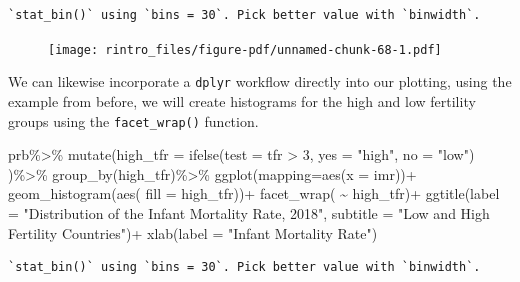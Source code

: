 \documentclass[
  letterpaper,
  DIV=11,
  numbers=noendperiod]{scrreprt}
\newenvironment{Shaded}{\begin{snugshade}}{\end{snugshade}}
\newcommand{\AttributeTok}[1]{\textcolor[rgb]{0.40,0.45,0.13}{#1}}
\newcommand{\DecValTok}[1]{\textcolor[rgb]{0.68,0.00,0.00}{#1}}
\newcommand{\FunctionTok}[1]{\textcolor[rgb]{0.28,0.35,0.67}{#1}}
\newcommand{\NormalTok}[1]{\textcolor[rgb]{0.00,0.23,0.31}{#1}}
\newcommand{\SpecialCharTok}[1]{\textcolor[rgb]{0.37,0.37,0.37}{#1}}
\newcommand{\StringTok}[1]{\textcolor[rgb]{0.13,0.47,0.30}{#1}}
\begin{document}
\begin{verbatim}
`stat_bin()` using `bins = 30`. Pick better value with `binwidth`.
\end{verbatim}

\begin{figure}[H]

{\centering \texttt{[image: rintro\_files/figure-pdf/unnamed-chunk-68-1.pdf]}

}

\end{figure}

We can likewise incorporate a \texttt{dplyr} workflow directly into our
plotting, using the example from before, we will create histograms for
the high and low fertility groups using the \texttt{facet\_wrap()}
function.

\begin{Shaded}
\begin{Highlighting}[]
\NormalTok{prb}\SpecialCharTok{\%\textgreater{}\%}
  \FunctionTok{mutate}\NormalTok{(}\AttributeTok{high\_tfr =} \FunctionTok{ifelse}\NormalTok{(}\AttributeTok{test =}\NormalTok{ tfr }\SpecialCharTok{\textgreater{}} \DecValTok{3}\NormalTok{,}
                           \AttributeTok{yes =} \StringTok{"high"}\NormalTok{,}
                           \AttributeTok{no =} \StringTok{"low"}\NormalTok{) )}\SpecialCharTok{\%\textgreater{}\%}
  \FunctionTok{group\_by}\NormalTok{(high\_tfr)}\SpecialCharTok{\%\textgreater{}\%}
  \FunctionTok{ggplot}\NormalTok{(}\AttributeTok{mapping=}\FunctionTok{aes}\NormalTok{(}\AttributeTok{x =}\NormalTok{ imr))}\SpecialCharTok{+}
  \FunctionTok{geom\_histogram}\NormalTok{(}\FunctionTok{aes}\NormalTok{( }\AttributeTok{fill =}\NormalTok{ high\_tfr))}\SpecialCharTok{+}
  \FunctionTok{facet\_wrap}\NormalTok{( }\SpecialCharTok{\textasciitilde{}}\NormalTok{ high\_tfr)}\SpecialCharTok{+}
  \FunctionTok{ggtitle}\NormalTok{(}\AttributeTok{label =} \StringTok{"Distribution of the Infant Mortality Rate, 2018"}\NormalTok{,}
          \AttributeTok{subtitle =} \StringTok{"Low and High Fertility Countries"}\NormalTok{)}\SpecialCharTok{+}
  \FunctionTok{xlab}\NormalTok{(}\AttributeTok{label =} \StringTok{"Infant Mortality Rate"}\NormalTok{)}
\end{Highlighting}
\end{Shaded}

\begin{verbatim}
`stat_bin()` using `bins = 30`. Pick better value with `binwidth`.
\end{verbatim}
\end{document}
